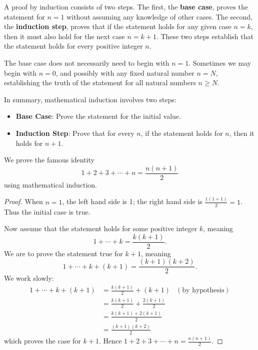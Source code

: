 A proof by induction consists of two steps. The first, the \textbf{base case}, proves the statement for $n = 1$ without assuming any knowledge of other cases. The second, the \textbf{induction step}, proves that if the statement holds for any given case $n = k$, then it must also hold for the next case $n = k + 1$. These two steps establish that the statement holds for every positive integer $n$.

The base case does not necessarily need to begin with $n = 1$. Sometimes we may begin with $n = 0$, and possibly with any fixed natural number $n = N$, establishing the truth of the statement for all natural numbers $n \geq N$.

In summary, mathematical induction involves two steps:
\begin{itemize}
    \item \textbf{Base Case}: Prove the statement for the initial value.
    \item \textbf{Induction Step}: Prove that for every $n$, if the statement holds for $n$, then it holds for $n + 1$.
\end{itemize}

\begin{example}
    We prove the famous identity
    \[
        1 + 2 + 3 + \cdots + n = \frac{n(n+1)}2
    \]
    using mathematical induction.
    \begin{proof}
        When $n = 1$, the left hand side is 1; the right hand side is $\frac{1(1+1)}{2} = 1$. Thus the initial case is true.

        Now assume that the statement holds for some positive integer $k$, meaning
        \[
            1 + \cdots + k = \frac{k(k+1)}2.
        \]
        We are to prove the statement true for $k+1$, meaning
        \[
            1 + \cdots + k + (k+1) = \frac{(k+1)(k+2)}2.
        \]
        We work slowly:
        \begin{align*}
            1 + \cdots + k + (k+1) &= \frac{k(k+1)}{2} + (k+1) & (\text{by hypothesis})\\
            &= \frac{k(k+1)}2 + \frac{2(k+1)}{2}\\
            &= \frac{k(k+1) + 2(k+1)}2\\
            &= \frac{(k+1)(k+2)}2
        \end{align*}
        which proves the case for $k + 1$. Hence $1 + 2 + 3 + \cdots + n = \frac{n(n+1)}2$.
    \end{proof}
\end{example}

